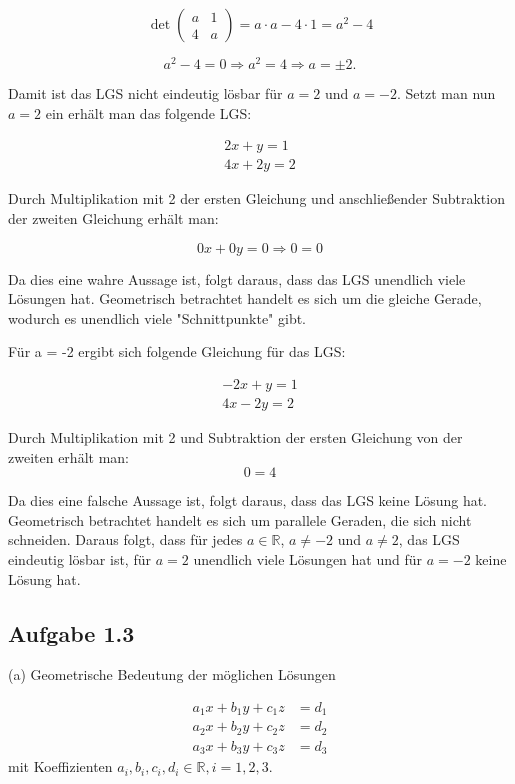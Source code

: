 \documentclass[11pt]{article}
\begin{document}
\[
\det\begin{pmatrix}
    a & 1 \\
    4 & a
\end{pmatrix} = a \cdot a - 4 \cdot 1 = a^2 - 4
\]

\[
    a^2 - 4 = 0 \Rightarrow a^2 = 4 \Rightarrow a = \pm 2.
\]

Damit ist das LGS nicht eindeutig lösbar für $a = 2$ und $a = -2$. Setzt man nun $a = 2$ ein erhält man das folgende LGS:

\[
\begin{aligned}
    2x + y = 1 \\
    4x + 2y = 2
\end{aligned}
\]

Durch Multiplikation mit 2 der ersten Gleichung und anschließender Subtraktion der zweiten Gleichung erhält man:

\[
    0x + 0y = 0 \Rightarrow 0 = 0
\]

Da dies eine wahre Aussage ist, folgt daraus, dass das LGS unendlich viele Lösungen hat.
Geometrisch betrachtet handelt es sich um die gleiche Gerade, wodurch es unendlich viele "Schnittpunkte" gibt.

Für a = -2 ergibt sich folgende Gleichung für das LGS:

\[
\begin{aligned}
    -2x + y = 1 \\
    4x-2y = 2
\end{aligned}
\]

Durch Multiplikation mit 2 und Subtraktion der ersten Gleichung von der zweiten erhält man:
\[
    0 = 4
\]

Da dies eine falsche Aussage ist, folgt daraus, dass das LGS keine Lösung hat.
Geometrisch betrachtet handelt es sich um parallele Geraden, die sich nicht schneiden.
Daraus folgt, dass für jedes $a \in \mathbb{R}$, $a \neq -2$ und $a \neq 2$, das LGS eindeutig lösbar ist, für $a = 2$ unendlich viele Lösungen hat und für $a = -2$ keine Lösung hat.


\subsection{Aufgabe 1.3}

(a) Geometrische Bedeutung der möglichen Lösungen

\[
\begin{aligned}
    a_1x + b_1y + c_1z & = d_1 \\
    a_2x + b_2y + c_2z & = d_2 \\
    a_3x + b_3y + c_3z & = d_3
\end{aligned}
\]
mit Koeffizienten $a_i, b_i, c_i, d_i \in \mathbb{R}, i = 1, 2, 3$.
\bigskip
\end{document}
